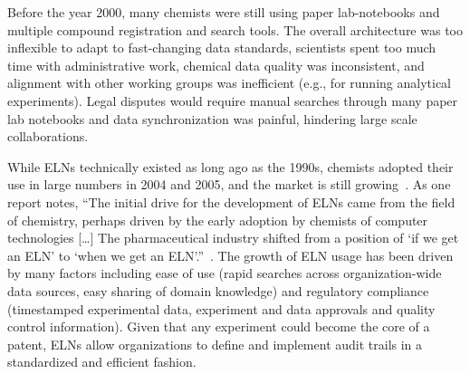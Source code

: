 \documentclass{../sig-alternate}
\begin{document}
Before the year 2000, many chemists were still using paper
lab-notebooks and multiple compound registration and search
tools. The overall architecture was too inflexible to
adapt to fast-changing data standards, scientists spent too much time
with administrative work, chemical data quality was inconsistent, and
alignment with other working groups was inefficient (e.g., for
running analytical experiments). Legal disputes would require manual
searches through many paper lab notebooks and data synchronization was
painful, hindering large scale collaborations.


While ELNs technically existed as long ago as the 1990s, chemists
adopted their use in large numbers in 2004 and 2005, and the market is
still growing~\cite{ELNstatus}. As one report notes, ``The initial
drive for the development of ELNs came from the field of chemistry,
perhaps driven by the early adoption by chemists of computer
technologies [\ldots] The pharmaceutical industry shifted from a
position of `if we get an ELN' to `when we get an
ELN'.''~\cite{ELNstatus}. The growth of ELN usage has been
driven by many factors including ease of use (rapid searches across
organization-wide data sources, easy sharing of domain knowledge) and
regulatory compliance (timestamped experimental data, experiment and
data approvals and quality control information). Given that any experiment could
become the core of a patent, ELNs allow organizations to define
and implement audit trails in a standardized and efficient fashion.
\end{document}
